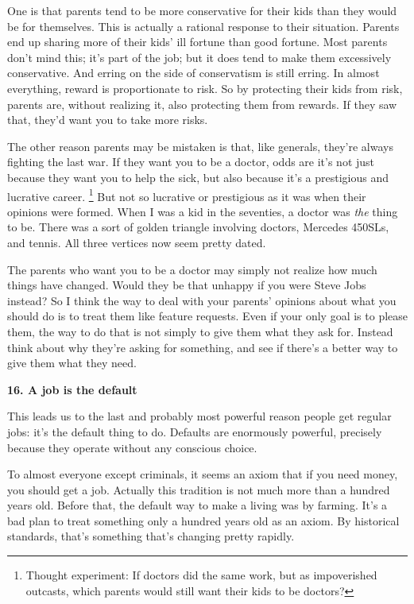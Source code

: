 One is that parents tend to be more conservative for their kids than
they would be for themselves. This is actually a rational response to
their situation. Parents end up sharing more of their kids' ill fortune
than good fortune. Most parents don't mind this; it's part of the job;
but it does tend to make them excessively conservative. And erring on
the side of conservatism is still erring. In almost everything, reward
is proportionate to risk. So by protecting their kids from risk, parents
are, without realizing it, also protecting them from rewards. If they
saw that, they'd want you to take more risks.

The other reason parents may be mistaken is that, like generals, they're
always fighting the last war. If they want you to be a doctor, odds are
it's not just because they want you to help the sick, but also because
it's a prestigious and lucrative career. \footnote{Thought experiment: If doctors did the same work, but as
impoverished outcasts, which parents would still want their kids to be
doctors?} But not
so lucrative or prestigious as it was when their opinions were formed.
When I was a kid in the seventies, a doctor was \emph{the} thing to be.
There was a sort of golden triangle involving doctors, Mercedes 450SLs,
and tennis. All three vertices now seem pretty dated.

The parents who want you to be a doctor may simply not realize how much
things have changed. Would they be that unhappy if you were Steve Jobs
instead? So I think the way to deal with your parents' opinions about
what you should do is to treat them like feature requests. Even if your
only goal is to please them, the way to do that is not simply to give
them what they ask for. Instead think about why they're asking for
something, and see if there's a better way to give them what they need.

\textbf{16. A job is the default}

This leads us to the last and probably most powerful reason people get
regular jobs: it's the default thing to do. Defaults are enormously
powerful, precisely because they operate without any conscious choice.

To almost everyone except criminals, it seems an axiom that if you need
money, you should get a job. Actually this tradition is not much more
than a hundred years old. Before that, the default way to make a living
was by farming. It's a bad plan to treat something only a hundred years
old as an axiom. By historical standards, that's something that's
changing pretty rapidly.

